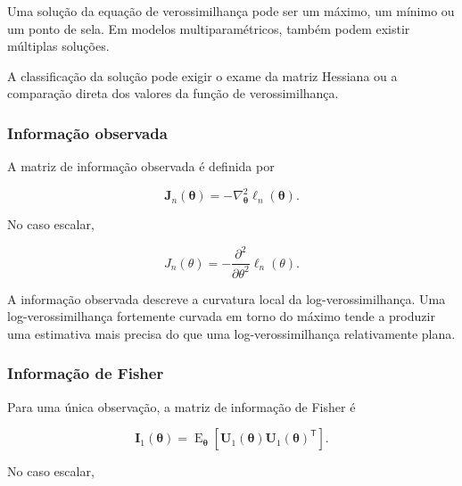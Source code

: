 \documentclass[
  letterpaper,
  DIV=11,
  numbers=noendperiod]{scrreprt}
\begin{document}
\begin{tcolorbox}[enhanced jigsaw, colback=white, leftrule=.75mm, colbacktitle=quarto-callout-warning-color!10!white, breakable, titlerule=0mm, bottomtitle=1mm, title=\textcolor{quarto-callout-warning-color}{\faExclamationTriangle}\hspace{0.5em}{Observação}, colframe=quarto-callout-warning-color-frame, toprule=.15mm, opacityback=0, bottomrule=.15mm, opacitybacktitle=0.6, arc=.35mm, toptitle=1mm, rightrule=.15mm, coltitle=black, left=2mm]

Uma solução da equação de verossimilhança pode ser um máximo, um mínimo
ou um ponto de sela. Em modelos multiparamétricos, também podem existir
múltiplas soluções.

A classificação da solução pode exigir o exame da matriz Hessiana ou a
comparação direta dos valores da função de verossimilhança.

\end{tcolorbox}

\subsubsection{Informação observada}\label{informauxe7uxe3o-observada}

A matriz de informação observada é definida por

\[\mathbf{J}_n(\boldsymbol\theta)
=
-
\nabla_{\boldsymbol\theta}^2
\ell_n(\boldsymbol\theta).\]

No caso escalar,

\[J_n(\theta)
=
-
\frac{\partial^2}{\partial\theta^2}
\ell_n(\theta).\]

A informação observada descreve a curvatura local da
log-verossimilhança. Uma log-verossimilhança fortemente curvada em torno
do máximo tende a produzir uma estimativa mais precisa do que uma
log-verossimilhança relativamente plana.

\subsubsection{Informação de Fisher}\label{informauxe7uxe3o-de-fisher-1}

Para uma única observação, a matriz de informação de Fisher é

\[\mathbf{I}_1(\boldsymbol\theta)
=
\operatorname{E}_{\boldsymbol\theta}
\left[
\mathbf{U}_1(\boldsymbol\theta)
\mathbf{U}_1(\boldsymbol\theta)^\mathsf{T}
\right].\]

No caso escalar,
\end{document}
